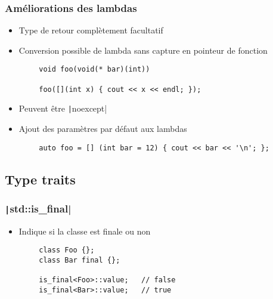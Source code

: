 \documentclass[C++.tex]{subfiles}
\begin{document}
\begin{frame}[fragile]
	\frametitle{Améliorations des lambdas}
	\begin{itemize}
		\item Type de retour complètement facultatif


		\item Conversion possible de lambda sans capture en pointeur de fonction

	\end{itemize}

	\begin{verbatim}
		void foo(void(* bar)(int))

		foo([](int x) { cout << x << endl; });
	\end{verbatim}

	\begin{itemize}
		\item Peuvent être \texttt|noexcept|
		\item Ajout des paramètres par défaut aux lambdas
	\end{itemize}

	\begin{verbatim}
		auto foo = [] (int bar = 12) { cout << bar << '\n'; };
	\end{verbatim}
\end{frame}

\subsection*{Type traits}
\begin{frame}[fragile]
	\frametitle{\texttt|std::is_final|}
	\begin{itemize}
		\item Indique si la classe est finale ou non
	\end{itemize}

	\begin{verbatim}
		class Foo {};
		class Bar final {};

		is_final<Foo>::value;   // false
		is_final<Bar>::value;   // true
	\end{verbatim}
\end{frame}
\end{document}
